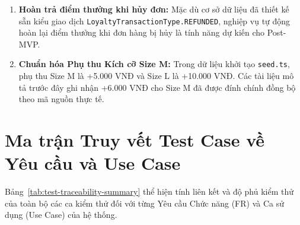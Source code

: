 \documentclass[12pt,a4paper,oneside]{report}
\begin{document}
\begin{enumerate}
    \item \textbf{Hoàn trả điểm thưởng khi hủy đơn:} Mặc dù cơ sở dữ liệu đã thiết kế sẵn kiểu giao dịch \texttt{LoyaltyTransactionType.REFUNDED}, nghiệp vụ tự động hoàn lại điểm thưởng khi đơn hàng bị hủy là tính năng dự kiến cho Post-MVP.
    \item \textbf{Chuẩn hóa Phụ thu Kích cỡ Size M:} Trong dữ liệu khởi tạo \texttt{seed.ts}, phụ thu Size M là +5.000 VNĐ và Size L là +10.000 VNĐ. Các tài liệu mô tả trước đây ghi nhận +6.000 VNĐ cho Size M đã được đính chính đồng bộ theo mã nguồn thực tế.
\end{enumerate}

\section{Ma trận Truy vết Test Case về Yêu cầu và Use Case}

Bảng~\ref{tab:test-traceability-summary} thể hiện tính liên kết và độ phủ kiểm thử của toàn bộ các ca kiểm thử đối với từng Yêu cầu Chức năng (FR) và Ca sử dụng (Use Case) của hệ thống.
\end{document}
